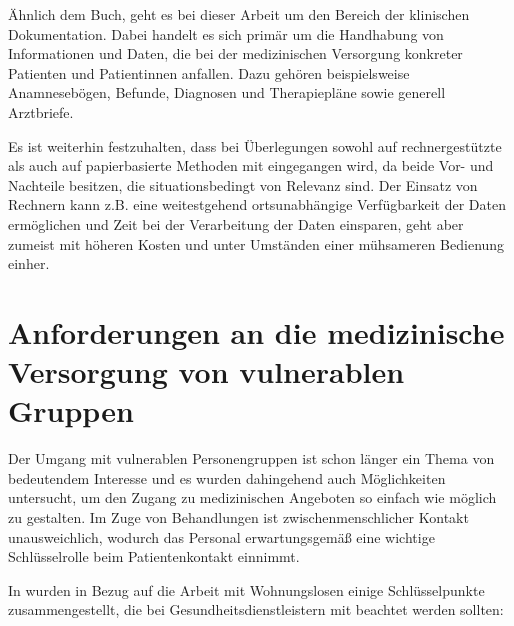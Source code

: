 Ähnlich dem Buch, geht es bei dieser Arbeit um den Bereich der klinischen Dokumentation. Dabei handelt es sich primär um die Handhabung von Informationen und Daten, die bei der medizinischen Versorgung konkreter Patienten und Patientinnen anfallen. Dazu gehören beispielsweise Anamnesebögen, Befunde, Diagnosen und Therapiepläne sowie generell Arztbriefe.

Es ist weiterhin festzuhalten, dass bei Überlegungen sowohl auf rechnergestützte als auch auf papierbasierte Methoden mit eingegangen wird, da beide Vor- und Nachteile besitzen, die situationsbedingt von Relevanz sind. Der Einsatz von Rechnern kann z.B. eine weitestgehend ortsunabhängige Verfügbarkeit der Daten ermöglichen und Zeit bei der Verarbeitung der Daten einsparen, geht aber zumeist mit höheren Kosten und unter Umständen einer mühsameren Bedienung einher.

\section{Anforderungen an die medizinische Versorgung von vulnerablen Gruppen}

Der Umgang mit vulnerablen Personengruppen ist schon länger ein Thema von bedeutendem Interesse und es wurden dahingehend auch Möglichkeiten untersucht, um den Zugang zu medizinischen Angeboten so einfach wie möglich zu gestalten. Im Zuge von Behandlungen ist zwischenmenschlicher Kontakt unausweichlich, wodurch das Personal erwartungsgemäß eine wichtige Schlüsselrolle beim Patientenkontakt einnimmt.

In \citet{Hwang.2014} wurden in Bezug auf die Arbeit mit Wohnungslosen einige Schlüsselpunkte zusammengestellt, die bei Gesundheitsdienstleistern mit beachtet werden sollten:

